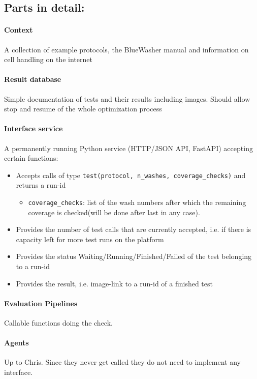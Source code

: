 \documentclass[a4paper,11pt]{article}
\begin{document}
\subsection{Parts in detail:}
\paragraph{Context}
    A collection of example protocols, the BlueWasher manual and information on cell handling on the internet
\paragraph{Result database}
    Simple documentation of tests and their results including images. Should allow stop and resume of the whole optimization process
\paragraph{Interface service}
    A permanently running Python service (HTTP/JSON API, FastAPI) accepting certain functions:
    \begin{itemize}
        \item Accepts calls of type \texttt{test(protocol, n\_washes, coverage\_checks)} and returns a run-id
            \begin{itemize}
                \item \texttt{coverage\_checks}: list of the wash numbers after which the remaining coverage is checked(will be done after last in any case).
            \end{itemize}
        \item Provides the number of test calls that are currently accepted, i.e. if there is capacity left for more test runs on the platform
        \item Provides the status Waiting/Running/Finished/Failed of the test belonging to a run-id
        \item Provides the result, i.e. image-link to a run-id of a finished test
    \end{itemize}
\paragraph{Evaluation Pipelines}
    Callable functions doing the check.
\paragraph{Agents}
    Up to Chris. Since they never get called they do not need to implement any interface.
\end{document}
